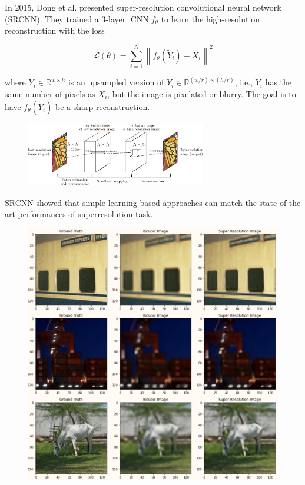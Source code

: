 \begin{definition}[8.6][SRCNN]
    In 2015, Dong et al. presented super-resolution convolutional neural network (SRCNN). They trained a 3-layer $\operatorname{CNN} f_{\theta}$ to learn the high-resolution reconstruction with the loss

    $$
    \mathcal{L}(\theta)=\sum_{i=1}^{N}\left\|f_{\theta}\left(\tilde{Y}_{i}\right)-X_{i}\right\|^{2}
    $$

    where $\tilde{Y}_{i} \in \mathbb{R}^{w \times h}$ is an upsampled version of $Y_{i} \in \mathbb{R}^{(w / r) \times(h / r)}$, i.e., $\tilde{Y}_{i}$ has the same number of pixels as $X_{i}$, but the image is pixelated or blurry. The goal is to have $f_{\theta}\left(\tilde{Y}_{i}\right)$ be a sharp reconstruction.

    \begin{figure}[H]
        \centering
        \includegraphics[width=0.7\textwidth]{.././assets/8.3.png}
    \end{figure}

    \par\noindent\textcolor{gray}{\hdashrule{\textwidth}{0.4pt}{1pt 2pt}}

    SRCNN showed that simple learning based approaches can match the state-of the art performances of superresolution task.

    \begin{figure}[H]
        \centering
        \includegraphics[width=1.0\textwidth]{.././assets/8.4.png}
    \end{figure}


\end{definition}
